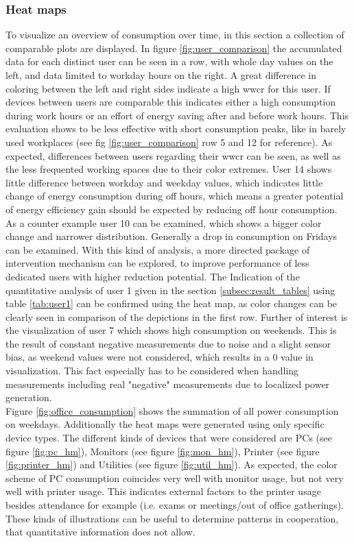 \subsubsection{Heat maps}
To visualize an overview of consumption over time, in this section a collection of comparable plots are displayed. In figure \ref{fig:user_comparison} the accumulated data for each distinct user can be seen in a row, with whole day values on the left, and data limited to \gls{workday} hours on the right. A great difference in coloring between the left and right sides indicate a high \gls{wwcr} for this user. If devices between users are comparable this indicates either a high consumption during work hours or an effort of energy saving after and before work hours. This evaluation shows to be less effective with short consumption peaks, like in barely used workplaces (see fig \ref{fig:user_comparison} row 5 and 12 for reference).
As expected, differences between users regarding their \gls{wwcr} can be seen, as well as the less frequented working spaces due to their color extremes. User 14 shows little difference between \gls{workday} and weekday values, which indicates little change of energy consumption during off hours, which means a greater potential of energy efficiency gain should be expected by reducing off hour consumption. As a counter example user 10 can be examined, which shows a bigger color change and narrower distribution. Generally a drop in consumption on Fridays can be examined.  With this kind of analysis, a more directed package of intervention mechanism can be explored, to improve performance of less dedicated users with higher reduction potential. The Indication of the quantitative analysis of user 1 given in the section \ref{subsec:result_tables} using table \ref{tab:user1} can be confirmed using the heat map, as color changes can be clearly seen in comparison of the depictions in the first row. Further of interest is the visualization of user 7 which shows high consumption on weekends. This is the result of constant negative measurements due to noise and a slight sensor bias, as weekend values were not considered, which results in a 0 value in visualization. This fact especially has to be considered when handling measurements including real "negative" measurements due to localized power generation.\\
Figure \ref{fig:office_consumption} shows the summation of all power consumption on weekdays. Additionally the heat maps were generated using only specific device types. The different kinds of devices that were considered are PCs (see figure \ref{fig:pc_hm}), Monitors (see figure \ref{fig:mon_hm}), Printer (see figure \ref{fig:printer_hm}) and Utilities (see figure \ref{fig:util_hm}). As expected, the color scheme of PC consumption coincides very well with monitor usage, but not very well with printer usage. This indicates external factors to the printer usage besides attendance for example (i.e. exams or meetings/out of office gatherings). These kinds of illustrations can be useful to determine patterns in cooperation, that quantitative information does not allow.
